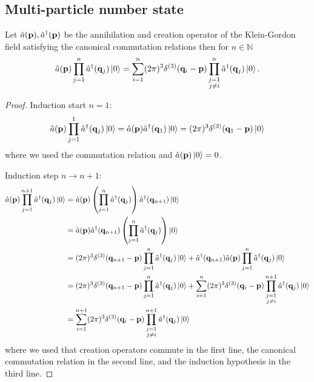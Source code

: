 \subsection{Multi-particle number state}

\begin{lemma}\label{th:normal_ordered_a1_cn}
	Let $\hat{a}(\vb{p}),\hat{a}^\dagger(\vb{p})$ be the annihilation and creation operator of the Klein-Gordon field satisfying the canonical commutation relations then for $n\in\mathbb{N}$
	\begin{equation}
		\hat{a}(\vb{p})
		\prod_{j=1}^n
		\hat{a}^\dagger(\vb{q}_j)
		\ket{0}
		=
		\sum_{i=1}^n
		(2\pi)^3
		\delta^{(3)}(\vb{q}_i-\vb{p})
		\prod_{\substack{j=1\\j\neq i}}^n
		\hat{a}^\dagger(\vb{q}_j)
		\ket{0}
		\label{eq:normal_ordered_a1_cn}
		.
	\end{equation}
\end{lemma}
\begin{proof}
	Induction start $n=1$:
	\begin{equation*}
		\hat{a}(\vb{p})
		\prod_{j=1}^1
		\hat{a}^\dagger(\vb{q}_j)
		\ket{0}
		=
		\hat{a}(\vb{p})
		\hat{a}^\dagger(\vb{q}_1)
		\ket{0}
		=
		(2\pi)^3
		\delta^{(3)}(\vb{q}_1-\vb{p})
		\ket{0}
	\end{equation*}
	where we used the commutation relation and $\hat{a}(\vb{p})\ket{0}=0$.

	Induction step $n\to n+1$:
	\begin{equation*}
		\begin{split}
			\hat{a}(\vb{p})
			\prod_{j=1}^{n+1}
			\hat{a}^\dagger(\vb{q}_j)
			\ket{0}
			&=
			\hat{a}(\vb{p})
			\left(
				\prod_{j=1}^n
				\hat{a}^\dagger(\vb{q}_j)
			\right)
			\hat{a}^\dagger(\vb{q}_{n+1})
			\ket{0}
			\\
			&=
			\hat{a}(\vb{p})
			\hat{a}^\dagger(\vb{q}_{n+1})
			\left(
				\prod_{j=1}^n
				\hat{a}^\dagger(\vb{q}_j)
			\right)
			\ket{0}
			\\
			&=
			(2\pi)^3
			\delta^{(3)}(\vb{q}_{n+1}-\vb{p})
			\prod_{j=1}^n
			\hat{a}^\dagger(\vb{q}_j)
			\ket{0}
			+
			\hat{a}^\dagger(\vb{q}_{n+1})
			\hat{a}(\vb{p})
			\prod_{j=1}^n
			\hat{a}^\dagger(\vb{q}_j)
			\ket{0}
			\\
			&=
			(2\pi)^3
			\delta^{(3)}(\vb{q}_{n+1}-\vb{p})
			\prod_{j=1}^n
			\hat{a}^\dagger(\vb{q}_j)
			\ket{0}
			+
			\sum_{i=1}^n
			(2\pi)^3
			\delta^{(3)}(\vb{q}_i-\vb{p})
			\prod_{\substack{j=1\\j\neq i}}^{n+1}
			\hat{a}^\dagger(\vb{q}_j)
			\ket{0}
			\\
			&=
			\sum_{i=1}^{n+1}
			(2\pi)^3
			\delta^{(3)}(\vb{q}_i-\vb{p})
			\prod_{\substack{j=1\\j\neq i}}^{n+1}
			\hat{a}^\dagger(\vb{q}_j)
			\ket{0}
		\end{split}
	\end{equation*}
	where we used that creation operators commute in the first line, the canonical commutation relation in the second line, and the induction hypothesis in the third line.
\end{proof}

